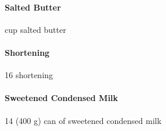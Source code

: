 \paragraph{Salted Butter} \half cup salted butter

\paragraph{Shortening} 16 \oz shortening

\paragraph{Sweetened Condensed Milk} 14 \oz (400 g) can of sweetened condensed milk

\egroup%



